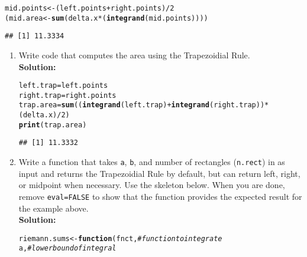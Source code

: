 \documentclass{article}\usepackage[]{graphicx}\usepackage[]{xcolor}
\makeatletter
\newcommand{\hlnum}[1]{\textcolor[rgb]{0.686,0.059,0.569}{#1}}%
\newcommand{\hlcom}[1]{\textcolor[rgb]{0.678,0.584,0.686}{\textit{#1}}}%
\newcommand{\hlopt}[1]{\textcolor[rgb]{0,0,0}{#1}}%
\newcommand{\hldef}[1]{\textcolor[rgb]{0.345,0.345,0.345}{#1}}%
\newcommand{\hlkwa}[1]{\textcolor[rgb]{0.161,0.373,0.58}{\textbf{#1}}}%
\newcommand{\hlkwb}[1]{\textcolor[rgb]{0.69,0.353,0.396}{#1}}%
\newcommand{\hlkwc}[1]{\textcolor[rgb]{0.333,0.667,0.333}{#1}}%
\newcommand{\hlkwd}[1]{\textcolor[rgb]{0.737,0.353,0.396}{\textbf{#1}}}%
\newenvironment{kframe}{%
 \def\at@end@of@kframe{}%
 \ifinner\ifhmode%
  \def\at@end@of@kframe{\end{minipage}}%
  \begin{minipage}{\columnwidth}%
 \fi\fi%
 \def\FrameCommand##1{\hskip\@totalleftmargin \hskip-\fboxsep
 \colorbox{shadecolor}{##1}\hskip-\fboxsep
     \hskip-\linewidth \hskip-\@totalleftmargin \hskip\columnwidth}%
 \MakeFramed {\advance\hsize-\width
   \@totalleftmargin\z@ \linewidth\hsize
   \@setminipage}}%
 {\par\unskip\endMakeFramed%
 \at@end@of@kframe}
\newenvironment{knitrout}{}{} %
\makeatother
\begin{document}
\begin{enumerate}
\begin{knitrout}
\begin{kframe}
\begin{alltt}
\hldef{mid.points} \hlkwb{<-} \hldef{(left.points}\hlopt{+}\hldef{right.points)}\hlopt{/}\hlnum{2}
\hldef{(mid.area} \hlkwb{<-} \hlkwd{sum}\hldef{(delta.x}\hlopt{*}\hldef{(}\hlkwd{integrand}\hldef{(mid.points))))}
\end{alltt}
\begin{verbatim}
## [1] 11.3334
\end{verbatim}
\end{kframe}
\end{knitrout}
\newpage
\begin{enumerate}
  \item Write code that computes the area using the Trapezoidial Rule.\\
  \textbf{Solution:}
\begin{knitrout}\scriptsize
{}\color{fgcolor}\begin{kframe}
\begin{alltt}
\hldef{left.trap} \hlkwb{=} \hldef{left.points}
\hldef{right.trap} \hlkwb{=} \hldef{right.points}
\hldef{trap.area} \hlkwb{=} \hlkwd{sum}\hldef{((}\hlkwd{integrand}\hldef{(left.trap)} \hlopt{+} \hlkwd{integrand}\hldef{(right.trap))}\hlopt{*}\hldef{(delta.x)}\hlopt{/}\hlnum{2}\hldef{)}
\hlkwd{print}\hldef{(trap.area)}
\end{alltt}
\begin{verbatim}
## [1] 11.3332
\end{verbatim}
\end{kframe}
\end{knitrout}
  \item Write a function that takes \texttt{a}, \texttt{b}, and number of 
  rectangles (\texttt{n.rect}) in as input and returns the Trapezoidial Rule 
  by default, but can return left, right, or midpoint when necessary. Use the
  skeleton below. When you are done, remove \texttt{eval=FALSE} to show that
  the function provides the expected result for the example above.\\
  \textbf{Solution:}
\begin{knitrout}\scriptsize
{}\color{fgcolor}\begin{kframe}
\begin{alltt}
\hldef{riemann.sums} \hlkwb{<-} \hlkwa{function}\hldef{(}\hlkwc{fnct}\hldef{,}                        \hlcom{# function to integrate}
                         \hlkwc{a}\hldef{,}                           \hlcom{# lower bound of integral}

\end{alltt}
\end{kframe}
\end{knitrout}
\end{enumerate}
\end{enumerate}
\end{document}
